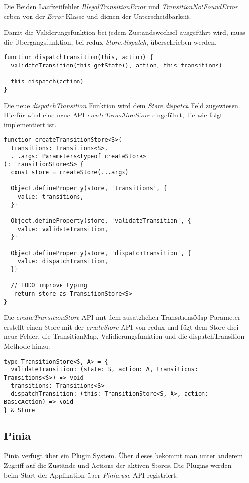 Die Beiden Laufzeitfehler \textit{IllegalTransitionError} und \textit{TransitionNotFoundError} erben von der \textit{Error} Klasse und dienen der Unterscheidbarkeit.

Damit die Validerungsfunktion bei jedem Zustandswechsel ausgeführt wird, muss die Übergangsfunktion, bei redux \textit{Store.dispatch}, überschrieben werden.

\begin{lstlisting}
function dispatchTransition(this, action) {
  validateTransition(this.getState(), action, this.transitions)
  
  this.dispatch(action)
}
\end{lstlisting}

Die neue \textit{dispatchTransition} Funktion wird dem \textit{Store.dispatch} Feld zugewiesen. Hierfür wird eine neue API \textit{createTransitionStore} eingeführt, die wie folgt implementiert ist.

\begin{lstlisting}
function createTransitionStore<S>(
  transitions: Transitions<S>,
  ...args: Parameters<typeof createStore>
): TransitionStore<S> {
  const store = createStore(...args)
  
  Object.defineProperty(store, 'transitions', {
    value: transitions,
  })
  
  Object.defineProperty(store, 'validateTransition', {
    value: validateTransition,
  })
  
  Object.defineProperty(store, 'dispatchTransition', {
    value: dispatchTransition,
  })
  
  // TODO improve typing
   return store as TransitionStore<S>
}
\end{lstlisting}

Die \textit{createTransitionStore} API mit dem zusätzlichen TransitionsMap Parameter erstellt einen Store mit der \textit{createStore} API von redux und fügt dem Store drei neue Felder, die TransitionMap, Validierungsfunktion und die dispatchTransition Methode hinzu.

\begin{lstlisting}
type TransitionStore<S, A> = {
  validateTransition: (state: S, action: A, transitions: Transitions<S>) => void
  transitions: Transitions<S>
  dispatchTransition: (this: TransitionStore<S, A>, action: BasicAction) => void
} & Store  
\end{lstlisting}

\subsection{Pinia}

Pinia verfügt über ein Plugin System. Über dieses bekommt man unter anderem Zugriff auf die Zustände und Actions der aktiven Stores. Die Plugins werden beim Start der Applikation über \textit{Pinia.use} API registriert.